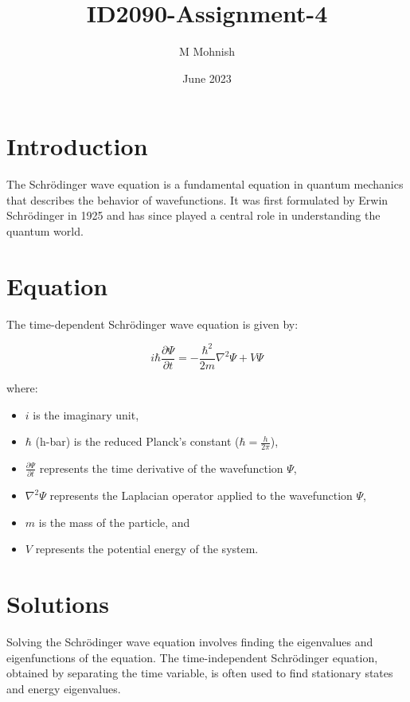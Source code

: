 \documentclass{article}
\title{ID2090-Assignment-4}
\author{M Mohnish}
\date{June 2023}
\begin{document}
\maketitle
\newpage

\section{Introduction}



The Schrödinger wave equation is a fundamental equation in quantum mechanics that describes the behavior of wavefunctions. It was first formulated by Erwin Schrödinger in 1925 and has since played a central role in understanding the quantum world.

\section{Equation}

The time-dependent Schrödinger wave equation is given by:

\begin{equation}
i\hbar \frac{\partial \Psi}{\partial t} = -\frac{\hbar^2}{2m} \nabla^2 \Psi + V \Psi
\end{equation}

where:
\begin{itemize}
  \item $i$ is the imaginary unit,
  \item $\hbar$ (h-bar) is the reduced Planck's constant ($\hbar = \frac{h}{2\pi}$),
  \item $\frac{\partial \Psi}{\partial t}$ represents the time derivative of the wavefunction $\Psi$,
  \item $\nabla^2 \Psi$ represents the Laplacian operator applied to the wavefunction $\Psi$,
  \item $m$ is the mass of the particle, and
  \item $V$ represents the potential energy of the system.
\end{itemize}

\section{Solutions}

Solving the Schrödinger wave equation involves finding the eigenvalues and eigenfunctions of the equation. The time-independent Schrödinger equation, obtained by separating the time variable, is often used to find stationary states and energy eigenvalues.
\end{document}
